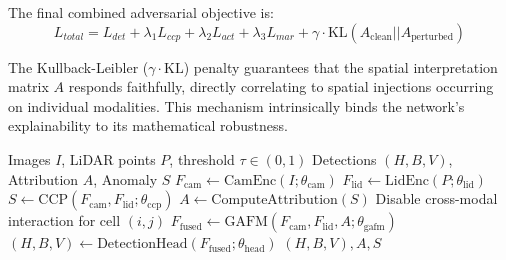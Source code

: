 The final combined adversarial objective is:
\begin{equation}
L_{total} = L_{det} + \lambda_1 L_{ccp} + \lambda_2 L_{act} + \lambda_3 L_{mar} + \gamma \cdot \text{KL}( A_{\text{clean}} || A_{\text{perturbed}} )
\end{equation}

The Kullback-Leibler ($\gamma \cdot \text{KL}$) penalty guarantees that the spatial interpretation matrix $A$ responds faithfully, directly correlating to spatial injections occurring on individual modalities. This mechanism intrinsically binds the network's explainability to its mathematical robustness.

\begin{algorithm}[h]
\caption{CRAF-X Inference with Explainability Output}
\begin{algorithmic}[1]
\Require Images $I$, LiDAR points $P$, threshold $\tau \in (0,1)$
\Ensure Detections $(H, B, V)$, Attribution $A$, Anomaly $S$
\State $F_{\text{cam}} \gets \text{CamEnc}(I; \theta_{\text{cam}})$
\State $F_{\text{lid}} \gets \text{LidEnc}(P; \theta_{\text{lid}})$
\State $S \gets \text{CCP}(F_{\text{cam}}, F_{\text{lid}}; \theta_{\text{ccp}})$ 
\State $A \gets \text{ComputeAttribution}(S)$
        \State Disable cross-modal interaction for cell $(i,j)$
    \EndIf
\EndFor
\State $F_{\text{fused}} \gets \text{GAFM}(F_{\text{cam}}, F_{\text{lid}}, A; \theta_{\text{gafm}})$
\State $(H, B, V) \gets \text{DetectionHead}(F_{\text{fused}}; \theta_{\text{head}})$
\State \Return $(H, B, V), A, S$
\end{algorithmic}
\end{algorithm}
